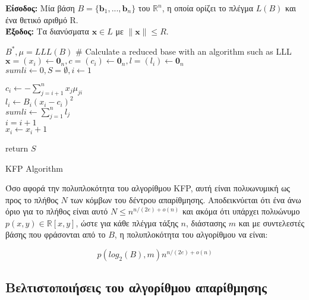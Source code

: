 \begin{algorithm}[h] \label{KFP}
\SetAlgoLined

{\bf Είσοδος:} Μία βάση $ B = \{\bm b_1, ..., \bm b_n \} $ του $ \mathbb{R}^n $, η οποία ορίζει το πλέγμα $ L(B) $ και ένα θετικό αριθμό R.  \\
{\bf Έξοδος:} Τα διανύσματα $ \bm x \in L $ με $ \| \bm x \| \leq R $.

\hfill

$ B^*, μ = LLL(B) $ \# Calculate a reduced base with an algorithm such as LLL \\
$ \bm x = (x_i) \gets \bm 0_n, c = (c_i) \gets \bm 0_n, l = (l_i) \gets \bm 0_n $ \\
$ sumli \gets 0, S = \emptyset, i \gets 1 $

 {
    $ c_i \gets - \sum_{j=i+1}^n x_j μ_{ji}$  \\
    $ l_i \gets B_i(x_i - c_i)^2 $ \\
    $ sumli \gets \sum_{j=1}^n l_j $ \\
    {
        $ i = i + 1 $ \\
        $ x_i \gets x_i + 1 $ \\
    }
    
} %
return $ S $

\caption{KFP Algorithm}
\end{algorithm}

Όσο αφορά την πολυπλοκότητα του αλγορίθμου KFP, αυτή είναι πολυωνυμική ως προς το πλήθος $ Ν $ των κόμβων του δέντρου απαρίθμησης. Αποδεικνύεται \cite{journals/corr/abs-0705-0965} ότι ένα άνω όριο για το πλήθος είναι αυτό $ Ν \leq n^{n/(2e)+o(n)}$ και ακόμα ότι υπάρχει πολυώνυμο $ p(x,y) \in \mathbb{R}[x,y] $, ώστε για κάθε πλέγμα τάξης $n$, διάστασης $m$ και με συντελεστές βάσης που φράσονται από το $ B $, η πολυπλοκότητα του αλγορίθμου να είναι: 

$$ p(log_2(B), m) n^{n/(2e)+o(n)} $$  

\subsection{Βελτιστοποιήσεις του αλγορίθμου απαρίθμησης }

